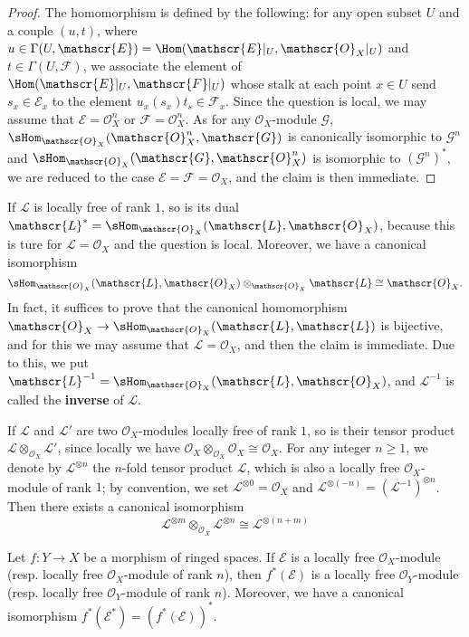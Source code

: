 \begin{proof}
The homomorphism is defined by the following: for any open subset $U$ and a couple $(u,t)$, where $u\in\Gamma(U,\mathscr{E})=\Hom(\mathscr{E}|_U,\mathscr{O}_X|_U)$ and $t\in\Gamma(U,\mathscr{F})$, we associate the element of $\Hom(\mathscr{E}|_U,\mathscr{F}|_U)$ whose stalk at each point $x\in U$ send $s_x\in\mathscr{E}_x$ to the element $u_x(s_x)t_s\in\mathscr{F}_x$. Since the question is local, we may assume that $\mathscr{E}=\mathscr{O}_X^n$ or $\mathscr{F}=\mathscr{O}_X^n$. As for any $\mathscr{O}_X$-module $\mathscr{G}$, $\sHom_{\mathscr{O}_X}(\mathscr{O}_X^n,\mathscr{G})$ is canonically isomorphic to $\mathscr{G}^n$ and $\sHom_{\mathscr{O}_X}(\mathscr{G},\mathscr{O}_X^n)$ is isomorphic to $(\mathscr{G}^n)^*$, we are reduced to the case $\mathscr{E}=\mathscr{F}=\mathscr{O}_X$, and the claim is then immediate.
\end{proof}
If $\mathscr{L}$ is locally free of rank $1$, so is its dual $\mathscr{L}^*=\sHom_{\mathscr{O}_X}(\mathscr{L},\mathscr{O}_X)$, because this is ture for $\mathscr{L}=\mathscr{O}_X$ and the question is local. Moreover, we have a canonical isomorphism
\[\sHom_{\mathscr{O}_X}(\mathscr{L},\mathscr{O}_X)\otimes_{\mathscr{O}_X}\mathscr{L}\cong\mathscr{O}_{X}.\]
In fact, it suffices to prove that the canonical homomorphism $\mathscr{O}_X\to\sHom_{\mathscr{O}_X}(\mathscr{L},\mathscr{L})$ is bijective, and for this we may assume that $\mathscr{L}=\mathscr{O}_X$, and then the claim is immediate. Due to this, we put $\mathscr{L}^{-1}=\sHom_{\mathscr{O}_X}(\mathscr{L},\mathscr{O}_X)$, and $\mathscr{L}^{-1}$ is called the \textbf{inverse} of $\mathscr{L}$.\par
If $\mathscr{L}$ and $\mathscr{L}'$ are two $\mathscr{O}_X$-modules locally free of rank $1$, so is their tensor product $\mathscr{L}\otimes_{\mathscr{O}_X}\mathscr{L}'$, since locally we have $\mathscr{O}_X\otimes_{\mathscr{O}_X}\mathscr{O}_X\cong\mathscr{O}_X$. For any integer $n\geq 1$, we denote by $\mathscr{L}^{\otimes n}$ the $n$-fold tensor product $\mathscr{L}$, which is also a locally free $\mathscr{O}_X$-module of rank $1$; by convention, we set $\mathscr{L}^{\otimes 0}=\mathscr{O}_X$ and $\mathscr{L}^{\otimes(-n)}=(\mathscr{L}^{-1})^{\otimes n}$. Then there exists a canonical isomorphism
\[\mathscr{L}^{\otimes m}\otimes_{\mathscr{O}_X}\mathscr{L}^{\otimes n}\cong\mathscr{L}^{\otimes(n+m)}\]
\begin{proposition}\label{sheaf of module local free inverse image}
Let $f:Y\to X$ be a morphism of ringed spaces. If $\mathscr{E}$ is a locally free $\mathscr{O}_X$-module (resp. locally free $\mathscr{O}_X$-module of rank $n$), then $f^*(\mathscr{E})$ is a locally free $\mathscr{O}_Y$-module (resp. locally free $\mathscr{O}_Y$-module of rank $n$). Moreover, we have a canonical isomorphism $f^*(\mathscr{E}^*)=(f^*(\mathscr{E}))^*$.
\end{proposition}
